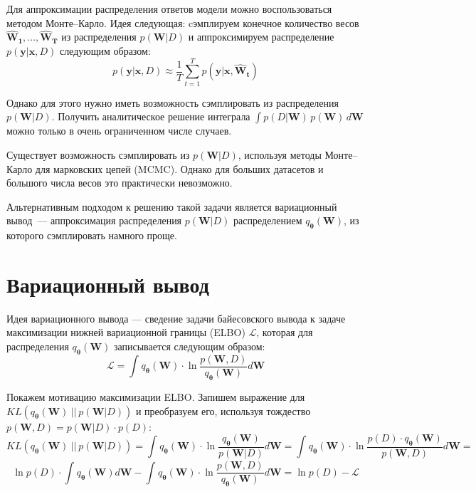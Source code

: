 \documentclass{article}
\begin{document}
    Для аппроксимации распределения ответов модели можно воспользоваться методом Монте--Карло.
    Идея следующая: cэмплируем конечное количество весов
    $
        \pmb{
            \hat{W}_1
        }
        ,
        \dots
        ,
        \pmb{
            \hat{W}_T
        }
    $
    из распределения $p(\pmb{W}| D)$ и аппроксимируем распределение
    $p(\pmb{y} | \pmb{x}, D)$ следующим образом:
    \[
        p(\pmb{y} | \pmb{x}, D)
        \approx
        \frac{1}{T}
        \sum_{t=1}^{T}{
            p (
                \pmb{y} | \pmb{x},
                \pmb{\hat{W}_{t}}
            )
        }
    \]

    Однако для этого нужно иметь возможность сэмплировать из распределения $p(\pmb{W}| D)$.
    Получить аналитическое решение интеграла
    $
        \int {
            p(D | \pmb{W})
            \,
            p(\pmb{W})
            \,
            d\pmb{W}
        }
    $
    можно только в очень ограниченном числе случаев.

    Существует возможность сэмплировать из $p(\pmb{W}| D)$,
    используя методы Монте--Карло для марковских цепей (MCMC).
    Однако для больших датасетов и большого числа весов это практически невозможно.

    Альтернативным подходом к решению такой задачи является вариационный вывод~---
    аппроксимация распределения $p(\pmb{W}| D)$ распределением $q_{\pmb{\theta}}(\pmb{W})$,
    из которого сэмплировать намного проще.

    \section{Вариационный вывод}

    Идея вариационного вывода --- сведение задачи байесовского вывода к задаче максимизации нижней вариационной границы (ELBO) $\mathcal{L}$, которая для распределения $q_{\pmb{\theta}}(\pmb{W})$ записывается следующим образом:
    \[
    \mathcal{L} =
    \int_{}{} q_{\pmb{\theta}}(\pmb{W}) \cdot \ln{\dfrac{p(\pmb{W}, D)}{q_{\pmb{\theta}}(\pmb{W})}} d \pmb{W}
    \]

    Покажем мотивацию максимизации ELBO. Запишем выражение для $KL(q_{\pmb{\theta}}(\pmb{W})~||~p(\pmb{W}| D))$ и преобразуем его, используя тождество $p(\pmb{W}, D) = p(\pmb{W}| D)\cdot p(D)$:
    \[
    KL(q_{\pmb{\theta}}(\pmb{W})~||~p(\pmb{W}| D)) =
    \int_{}{} q_{\pmb{\theta}}(\pmb{W}) \cdot \ln{\dfrac{q_{\pmb{\theta}}(\pmb{W})}{p(\pmb{W}| D)}} d \pmb{W} =
    \int_{}{} q_{\pmb{\theta}}(\pmb{W}) \cdot \ln{\dfrac{p(D) \cdot q_{\pmb{\theta}}(\pmb{W})}{p(\pmb{W}, D)}} d \pmb{W} =
    \]\[
    \ln{p(D)} \cdot \int_{}{} q_{\pmb{\theta}}(\pmb{W}) d \pmb{W} - \int_{}{} q_{\pmb{\theta}}(\pmb{W}) \cdot \ln{\dfrac{p(\pmb{W}, D)}{q_{\pmb{\theta}}(\pmb{W})}} d \pmb{W} =
    \ln{p(D)} - \mathcal{L}
    \]
\end{document}
